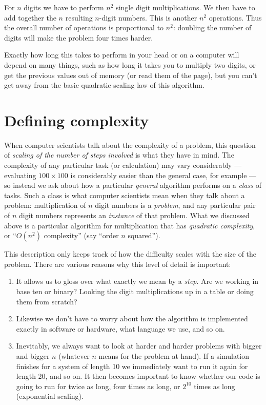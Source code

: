 \documentclass[
  letterpaper,
  DIV=11,
  numbers=noendperiod]{scrreprt}
\theoremstyle{definition}
\theoremstyle{remark}
\begin{document}
For \(n\) digits we have to perform \(n^2\) single digit
multiplications. We then have to add together the \(n\) resulting
\(n\)-digit numbers. This is another \(n^2\) operations. Thus the
overall number of operations is proportional to \(n^2\): doubling the
number of digits will make the problem four times harder.

Exactly how long this takes to perform in your head or on a computer
will depend on many things, such as how long it takes you to multiply
two digits, or get the previous values out of memory (or read them of
the page), but you can't get away from the basic quadratic scaling law
of this algorithm.

\hypertarget{defining-complexity}{%
\section{Defining complexity}\label{defining-complexity}}

When computer scientists talk about the complexity of a problem, this
question of \emph{scaling of the number of steps involved} is what they
have in mind. The complexity of any particular task (or calculation) may
vary considerably --- evaluating \(100\times 100\) is considerably
easier than the general case, for example --- so instead we ask about
how a particular \emph{general} algorithm performs on a \emph{class} of
tasks. Such a class is what computer scientists mean when they talk
about a problem: multiplication of \(n\) digit numbers is a
\emph{problem}, and any particular pair of \(n\) digit numbers
represents an \emph{instance} of that problem. What we discussed above
is a particular algorithm for multiplication that has \emph{quadratic
complexity}, or ``\(O(n^2)\) complexity'' (say ``order \(n\) squared'').

This description only keeps track of how the difficulty scales with the
size of the problem. There are various reasons why this level of detail
is important:

\begin{enumerate}
\def\labelenumi{\arabic{enumi}.}
\item
  It allows us to gloss over what exactly we mean by a \emph{step}. Are
  we working in base ten or binary? Looking the digit multiplications up
  in a table or doing them from scratch?
\item
  Likewise we don't have to worry about how the algorithm is implemented
  exactly in software or hardware, what language we use, and so on.
\item
  Inevitably, we always want to look at harder and harder problems with
  bigger and bigger \(n\) (whatever \(n\) means for the problem at
  hand). If a simulation finishes for a system of length 10 we
  immediately want to run it again for length 20, and so on. It then
  becomes important to know whether our code is going to run for twice
  as long, four times as long, or \(2^{10}\) times as long (exponential
  scaling).
\end{enumerate}
\end{document}
